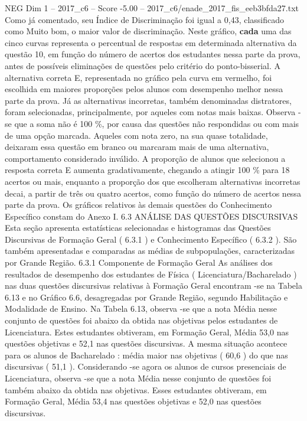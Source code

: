 \begin{textsample}{NEG Dim 1 – 2017\_c6 – Score -5.00 – 2017\_c6/enade\_2017\_fis\_eeb3bfda27.txt}
Como já comentado, seu Índice de Discriminação foi igual a 0,43, classificado como Muito bom, o maior valor de discriminação.
Neste gráfico, \textbf{cada} uma das cinco curvas representa o percentual de respostas em determinada alternativa da questão 10, em função do número de acertos dos estudantes nessa parte da prova, antes de possíveis eliminações de questões pelo critério do ponto-bisserial.
A alternativa correta E, representada no gráfico pela curva em vermelho, foi escolhida em maiores proporções pelos alunos com desempenho melhor nessa parte da prova.
Já as alternativas incorretas, também denominadas distratores, foram selecionadas, principalmente, por aqueles com notas mais baixas.
Observa -se que a soma não é 100 \%, por causa das questões não respondidas ou com mais de uma opção marcada.
Aqueles com nota zero, na sua quase totalidade, deixaram essa questão em branco ou marcaram mais de uma alternativa, comportamento considerado inválido.
A proporção de alunos que selecionou a resposta correta E aumenta gradativamente, chegando a atingir 100 \% para 18 acertos ou mais, enquanto a proporção dos que escolheram alternativas incorretas decai, a partir de três ou quatro acertos, como função do número de acertos nessa parte da prova.
Os gráficos relativos às demais questões do Conhecimento Específico constam do Anexo I. 6.3 ANÁLISE DAS QUESTÕES DISCURSIVAS Esta seção apresenta estatísticas selecionadas e histogramas das Questões Discursivas de Formação Geral ( 6.3.1 ) e Conhecimento Específico ( 6.3.2 ).
São também apresentadas e comparadas as médias de subpopulações, caracterizadas por Grande Região. 6.3.1 Componente de Formação Geral As análises dos resultados de desempenho dos estudantes de Física ( Licenciatura/Bacharelado ) nas duas questões discursivas relativas à Formação Geral encontram -se na Tabela 6.13 e no Gráfico 6.6, desagregadas por Grande Região, segundo Habilitação e Modalidade de Ensino.
Na Tabela 6.13, observa -se que a nota Média nesse conjunto de questões foi abaixo da obtida nas objetivas pelos estudantes de Licenciatura.
Estes estudantes obtiveram, em Formação Geral, Média 53,0 nas questões objetivas e 52,1 nas questões discursivas.
A mesma situação acontece para os alunos de Bacharelado : média maior nas objetivas ( 60,6 ) do que nas discursivas ( 51,1 ).
Considerando -se agora os alunos de cursos presenciais de Licenciatura, observa -se que a nota Média nesse conjunto de questões foi também abaixo da obtida nas objetivas.
Esses estudantes obtiveram, em Formação Geral, Média 53,4 nas questões objetivas e 52,0 nas questões discursivas.

\end{textsample}
